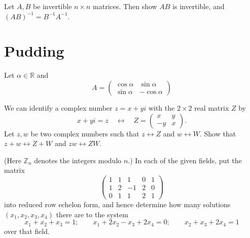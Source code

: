 \documentclass[answers]{exam}
\begin{document}
\begin{questions}
\question%
Let $A, B$ be invertible $n \times n$ matrices. Then show $A B$ is invertible, and $(A B)^{-1}=B^{-1} A^{-1}$.

\end{questions}



\section*{Pudding}
\begin{questions}

\question%
Let $\alpha \in \mathbb{R}$ and\[
	A=\begin{pmatrix}
		\cos \alpha & \sin \alpha \\
		\sin \alpha & -\cos \alpha
	\end{pmatrix}
\]



\question%
We can identify a complex number $z=x+y i$ with the $2 \times 2$ real matrix $Z$ by \[
	x+y i=z \quad \leftrightarrow \quad Z=\begin{pmatrix}
		x & y \\
		-y & x
	\end{pmatrix}.
\] Let $z, w$ be two complex numbers such that $z \leftrightarrow Z$ and $w \leftrightarrow W$. Show that $z+w \leftrightarrow Z+W$ and $z w \leftrightarrow Z W$.



\question%
(Here $\mathbb{Z}_{n}$ denotes the integers modulo $n$.) In each of the given fields, put the matrix \[
	\begin{pmatrix}
		1 & 1 & 1 & 0 & 1 \\
		1 & 2 & -1 & 2 & 0 \\
		0 & 1 & 1 & 2 & 1
	\end{pmatrix}
\] into reduced row echelon form, and hence determine how many solutions $(x_{1}, x_{2}, x_{3}, x_{4})$ there are to the system \[
	x_{1}+x_{2}+x_{3}=1;\qquad
	x_{1}+2 x_{2}-x_{3}+2 x_{4}=0;\qquad
	x_{2}+x_{3}+2 x_{4}=1
\] over that field.
\begin{parts}

\end{parts}
\end{questions}
\end{document}

